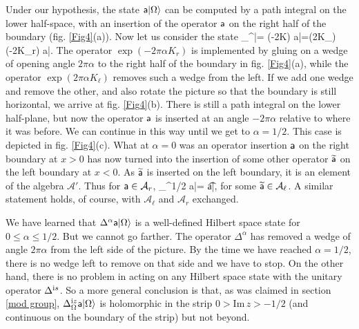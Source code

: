 \documentclass[12pt]{article}
\def\a{{\sf a}}
\def\ra{\rangle}
\numberwithin{equation}{section}
\def\A{{\mathcal A}}
\begin{document}
 Under our hypothesis, the state $\a|\Omega\ra$ can be computed by a path integral on the lower half-space, with an insertion of
 the operator $\a$ on the right half of the boundary (fig. \ref{Fig4}(a)).   Now let us consider the state
 \be\label{constate} \Delta_\Omega^\alpha \a|\Omega\ra = \exp(-2\pi \alpha K) \a|\Omega\ra =\exp(2\pi \alpha K_\ell) \exp(-2\pi \alpha K_r) \a|\Omega\ra. \ee
 The operator $\exp(-2\pi \alpha K_r)$ is implemented by gluing on a wedge of opening angle $2\pi \alpha$ to the right half of the boundary
 in fig. \ref{Fig4}(a), while the operator $\exp(2\pi \alpha K_\ell)$ removes such a wedge from the left.
   If we add one wedge and remove the other,
 and also rotate the picture so that the boundary is still horizontal, we arrive at fig. \ref{Fig4}(b).  There is still a path integral on the
 lower half-plane, but now the operator $\a$ is inserted at an angle $-2\pi \alpha$ relative to where it was before.   We can continue
 in this way until we get to $\alpha=1/2$.  This case is depicted in fig. \ref{Fig4}(c).    What at $\alpha=0$ was an operator insertion $\a$
 on the right boundary at $x>0$ has now turned into the insertion of some other operator $\t \a$ on the left boundary at $x<0$.
 As $\t \a$ is inserted on the left boundary, it is an element of the algebra $\A'$.   Thus for $\a\in \A_r$, 
 \be\label{novoc}\Delta_\Omega^{1/2} \a|\Omega\ra = \t \a|\Omega\ra, \ee
 for some $\t \a\in \A_\ell$.  A similar statement holds, of course, with $\A_\ell$ and $\A_r$ exchanged.
 
 We have learned that $\Delta^\alpha \a|\Omega\ra$ is a well-defined Hilbert space state for $0\leq \alpha\leq 1/2$.  But we cannot go farther.
 The operator $\Delta^\alpha$ has removed a wedge of angle $2\pi \alpha$ from the left side of the picture.  By the time we have reached $\alpha=1/2$,
 there is no wedge left to remove on that side and we have to stop.  On the other
 hand, there is no problem in acting on any Hilbert space state with the  unitary operator $\Delta^{{\mathrm i} s}$. 
 So a more general conclusion is that, as was claimed in section \ref{mod group}, $\Delta_\Omega^{\i z}\a|\Omega\ra$ is holomorphic
 in the strip $0>\mathrm{Im}\, z>-1/2$ (and continuous on the boundary of the strip) but not beyond.
 
\end{document}
